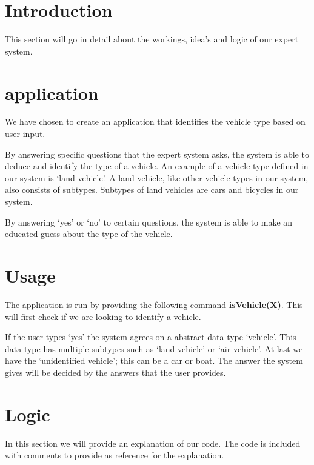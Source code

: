 \section{Introduction} \label{man-introduction}
This section will go in detail about the workings, idea's and logic of our expert system.

\section{application} \label{man-application}
We have chosen to create an application that identifies the vehicle type based on user input.

By answering specific questions that the expert system asks,
the system is able to deduce and identify the type of a vehicle.
An example of a vehicle type defined in our system is `land vehicle'.
A land vehicle, like other vehicle types in our system, also consists
of subtypes. Subtypes of land vehicles are cars and bicycles in our system.

By answering `yes' or `no' to certain questions,
the system is able to make an educated
guess about the type of the vehicle.

\section{Usage} \label{man-usage}
The application is run by providing the following command \textbf{isVehicle(X)}.
This will first check if we are looking to identify a vehicle.

If the user types `yes' the system agrees on a abstract data type `vehicle'.
This data type has multiple subtypes such as `land vehicle' or `air vehicle'.
At last we have the `unidentified vehicle'; this can be a car or boat.
The answer the system gives will be decided by the answers that the user provides.

\newpage
\section{Logic} \label{man-logic}
In this section we will provide an explanation of our code.
The code is included with comments to provide as reference for the explanation.

